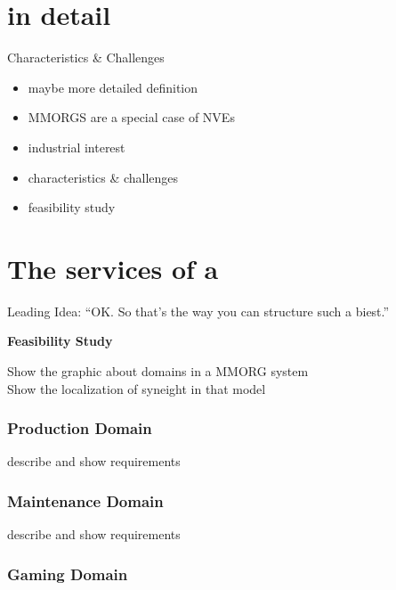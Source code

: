 \section{\MMORGS in detail}
Characteristics \& Challenges
\begin{itemize}
	\item maybe more detailed definition
	\item MMORGS are a special case of NVEs
	\item industrial interest
	\item characteristics \& challenges
	\item feasibility study
\end{itemize}

\section{The services of a \MMORG}
Leading Idea: ``OK. So that's the way you can structure such a
biest.''

\textbf{Feasibility Study}

Show the graphic about domains in a MMORG system\\ Show the
localization of syneight in that model

\subsubsection{Production Domain}

describe and show requirements

\subsubsection{Maintenance Domain}

describe and show requirements

\subsubsection{Gaming Domain}

